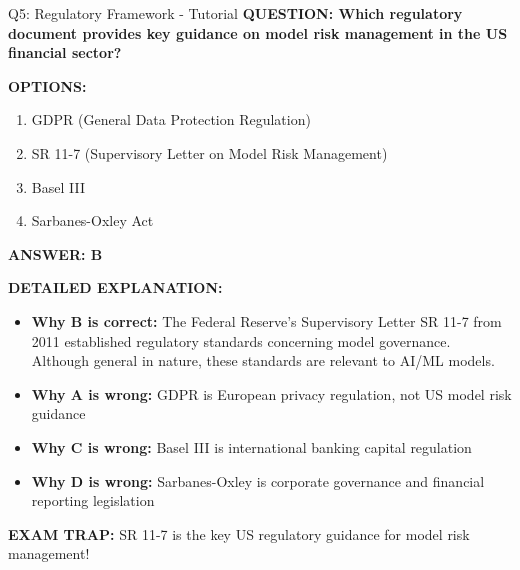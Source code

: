 \documentclass[8pt]{beamer}
\begin{document}
	\begin{frame}{Q5: Regulatory Framework - Tutorial}
		\fontsize{6.5}{7.5}\selectfont
		\textbf{QUESTION: Which regulatory document provides key guidance on model risk management in the US financial sector?}
		
		\vspace{0.1cm}
		\textbf{OPTIONS:}
		\begin{enumerate}
			\item GDPR (General Data Protection Regulation)
			\item SR 11-7 (Supervisory Letter on Model Risk Management)
			\item Basel III
			\item Sarbanes-Oxley Act
		\end{enumerate}
		
		\vspace{0.1cm}
		\textcolor{myblue}{\textbf{ANSWER: B}}
		
		\vspace{0.1cm}
		\textbf{DETAILED EXPLANATION:}
		\begin{itemize}
			\item \textbf{Why B is correct:} The Federal Reserve's Supervisory Letter SR 11-7 from 2011 established regulatory standards concerning model governance. Although general in nature, these standards are relevant to AI/ML models.
			\item \textbf{Why A is wrong:} GDPR is European privacy regulation, not US model risk guidance
			\item \textbf{Why C is wrong:} Basel III is international banking capital regulation
			\item \textbf{Why D is wrong:} Sarbanes-Oxley is corporate governance and financial reporting legislation
		\end{itemize}
		
		\textcolor{myred}{\textbf{EXAM TRAP:}} SR 11-7 is the \textcolor{myblue}{key US regulatory guidance} for model risk management!
	\end{frame}
	
	
\end{document}
